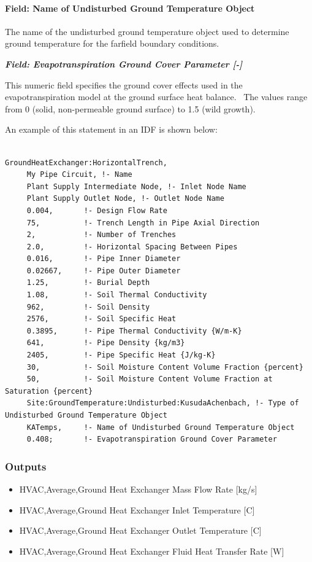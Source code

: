 \paragraph{Field: Name of Undisturbed Ground Temperature Object}\label{field-name-of-undisturbed-ground-temperature-object-1}

The name of the undisturbed ground temperature object used to determine ground temperature for the farfield boundary conditions.

\textbf{\emph{Field: Evapotranspiration Ground Cover Parameter {[}-{]}}}

This numeric field specifies the ground cover effects used in the evapotranspiration model at the ground surface heat balance.~ The values range from 0 (solid, non-permeable ground surface) to 1.5 (wild growth).

An example of this statement in an IDF is shown below:

\begin{lstlisting}

GroundHeatExchanger:HorizontalTrench,
     My Pipe Circuit, !- Name
     Plant Supply Intermediate Node, !- Inlet Node Name
     Plant Supply Outlet Node, !- Outlet Node Name
     0.004,       !- Design Flow Rate
     75,          !- Trench Length in Pipe Axial Direction
     2,           !- Number of Trenches
     2.0,         !- Horizontal Spacing Between Pipes
     0.016,       !- Pipe Inner Diameter
     0.02667,     !- Pipe Outer Diameter
     1.25,        !- Burial Depth
     1.08,        !- Soil Thermal Conductivity
     962,         !- Soil Density
     2576,        !- Soil Specific Heat
     0.3895,      !- Pipe Thermal Conductivity {W/m-K}
     641,         !- Pipe Density {kg/m3}
     2405,        !- Pipe Specific Heat {J/kg-K}
     30,          !- Soil Moisture Content Volume Fraction {percent}
     50,          !- Soil Moisture Content Volume Fraction at Saturation {percent}
     Site:GroundTemperature:Undisturbed:KusudaAchenbach, !- Type of Undisturbed Ground Temperature Object
     KATemps,     !- Name of Undisturbed Ground Temperature Object
     0.408;       !- Evapotranspiration Ground Cover Parameter
\end{lstlisting}

\subsubsection{Outputs}\label{outputs-14-000}

\begin{itemize}
\item
  HVAC,Average,Ground Heat Exchanger Mass Flow Rate {[}kg/s{]}
\item
  HVAC,Average,Ground Heat Exchanger Inlet Temperature {[}C{]}
\item
  HVAC,Average,Ground Heat Exchanger Outlet Temperature {[}C{]}
\item
  HVAC,Average,Ground Heat Exchanger Fluid Heat Transfer Rate {[}W{]}
\end{itemize}

